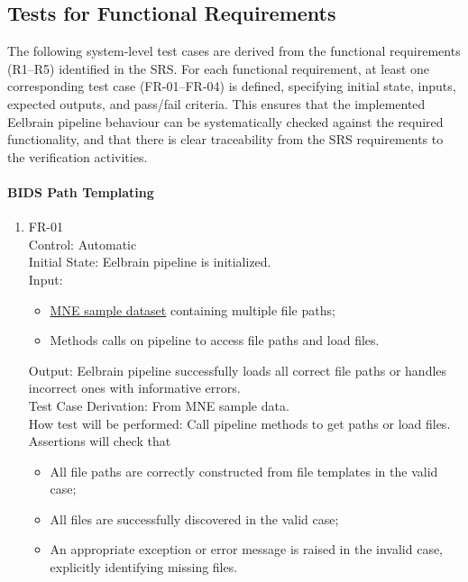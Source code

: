 \documentclass[12pt, titlepage]{article}
\begin{document}
\subsection{Tests for Functional Requirements}


The following system-level test cases are derived from the functional requirements (R1--R5) identified in the SRS. For each functional requirement, at least one corresponding test case (FR-01--FR-04) is defined, specifying initial state, inputs, expected outputs, and pass/fail criteria. This ensures that the implemented Eelbrain pipeline behaviour can be systematically checked against the required functionality, and that there is clear traceability from the SRS requirements to the verification activities.

		
\paragraph{BIDS Path Templating}


\begin{enumerate}


\item{FR-01\\}
    Control: Automatic \\
    Initial State: Eelbrain pipeline is initialized. \\
    Input:
        \begin{itemize}
            \item \href{https://mne.tools/stable/documentation/datasets.html#sample}{MNE sample dataset} containing multiple file paths;
            \item Methods calls on pipeline to access file paths and load files.
        \end{itemize}
    Output: Eelbrain pipeline successfully loads all correct file paths or handles incorrect ones with informative errors. \\
    Test Case Derivation: From MNE sample data. \\
    How test will be performed: Call pipeline methods to get paths or load files. Assertions will check that
        \begin{itemize}
            \item All file paths are correctly constructed from file templates in the valid case;
            \item All files are successfully discovered in the valid case;
            \item An appropriate exception or error message is raised in the invalid case, explicitly identifying missing files.
        \end{itemize}


\end{enumerate}
\end{document}
